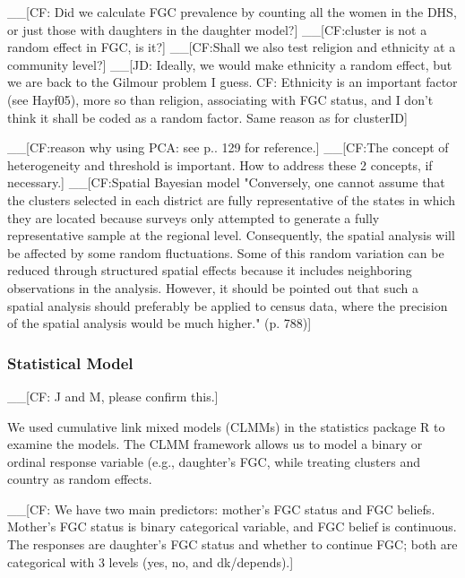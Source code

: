 \documentclass[12pt,]{article}
\begin{document}
\_\_{[}CF: Did we calculate FGC prevalence by counting all the women in the DHS, or just those with daughters in the daughter model?{]}
\_\_{[}CF:cluster is not a random effect in FGC, is it?{]}
\_\_{[}CF:Shall we also test religion and ethnicity at a community level?{]}
\_\_{[}JD: Ideally, we would make ethnicity a random effect, but we are back to the Gilmour problem I guess. CF: Ethnicity is an important factor (see Hayf05), more so than religion, associating with FGC status, and I don't think it shall be coded as a random factor.  Same reason as for clusterID{]}

\_\_{[}CF:reason why using PCA:  see \cite{Hayf05} p.. 129 for reference.{]}
\_\_{[}CF:The concept of heterogeneity and threshold is important.  How to address these 2 concepts, if necessary.{]}
\_\_{[}CF:Spatial Bayesian model \cite{KandNwak09} "Conversely, one cannot assume that the clusters selected in each district are fully representative of the states in which they are located because surveys only attempted to generate a fully representative sample at the regional level. Consequently, the spatial analysis will be affected by some random fluctuations.  Some of this random variation can be reduced through structured spatial effects because it includes neighboring observations in the analysis. However, it should be pointed out that such a spatial analysis should preferably be applied to census data, where the precision of the spatial analysis would be much higher." (p. 788){]}


\subsubsection{Statistical Model}\label{statistical-model}

\_\_{[}CF: J and M, please confirm this.{]} 

We used cumulative link mixed models (CLMMs) in the statistics package R \cite{Rstats,Rpackage_ordinal} to examine the models.  The CLMM framework allows us to model a binary or ordinal response variable (e.g., daughter's FGC, while treating clusters and country as random effects.

\_\_{[}CF: We have two main predictors:  mother's FGC status and FGC beliefs.  Mother's FGC status is binary categorical variable, and FGC belief is continuous.  The responses are daughter's FGC status and whether to continue FGC; both are categorical with 3 levels (yes, no, and dk/depends).{]} 
\end{document}
